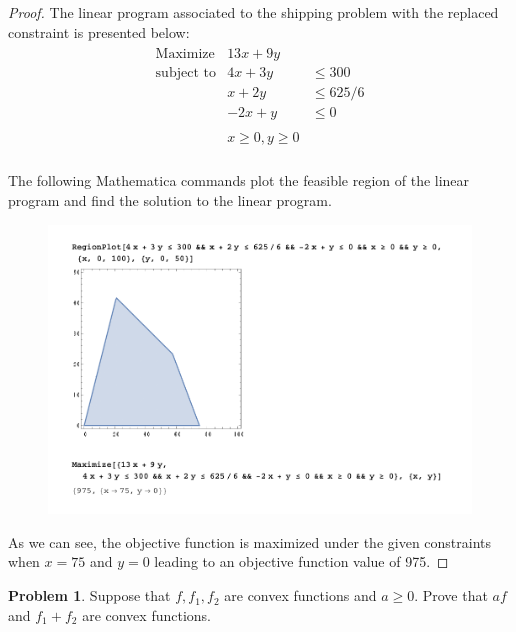 \documentclass[12pt]{article}
\theoremstyle{definition}
\newtheorem{problem}{Problem}
\begin{document}
\begin{proof}
  The linear program associated to the shipping problem with the replaced constraint
  is presented below:
  \begin{align*}
    \begin{array} {lll}
      \text{Maximize} & 13x + 9y & \\
      \text{subject to} & 4x + 3y &\leq 300 \\
      & x + 2y &\leq 625/6\\
      & -2x + y &\leq 0 \\ \\
      & x \geq 0, y \geq 0 & \\
    \end{array}
  \end{align*}

  The following Mathematica commands plot the feasible region of the linear
  program and find the solution to the linear program.
  \begin{figure}[!h]
    \centerline{\includegraphics[scale=1.0]{linear_program}}
  \end{figure}

  As we can see, the objective function is maximized under the given constraints
  when $x = 75$ and $y = 0$ leading to an objective function value of 975.

\end{proof}
\newpage


\begin{problem}
  Suppose that $f, f_1, f_2$ are convex functions and $a \geq 0$. Prove that
  $af$ and $f_1 + f_2$ are convex functions.
\end{problem}
\end{document}
